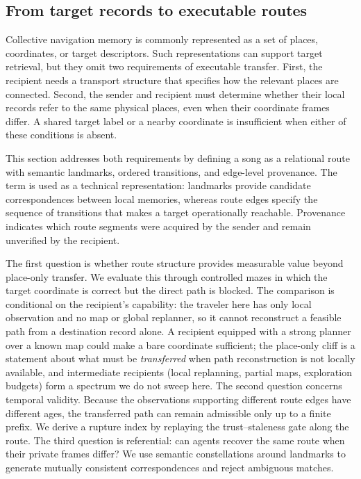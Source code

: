 \documentclass{article}
\begin{document}
\FloatBarrier
\subsection{From target records to executable routes}
\label{p3:sec:intro}

Collective navigation memory is commonly represented as a set of
places, coordinates, or target descriptors. Such representations can
support target retrieval, but they omit two requirements of executable
transfer. First, the recipient needs a transport structure that
specifies how the relevant places are connected. Second, the sender
and recipient must determine whether their local records refer to the
same physical places, even when their coordinate frames differ. A
shared target label or a nearby coordinate is insufficient when either
of these conditions is absent.

This section addresses both requirements by defining a song as a
relational route with semantic landmarks, ordered transitions, and
edge-level provenance. The term is used as a technical representation:
landmarks provide candidate correspondences between local memories,
whereas route edges specify the sequence of transitions that makes a
target operationally reachable. Provenance indicates which route
segments were acquired by the sender and remain unverified by the
recipient.

The first question is whether route structure provides measurable
value beyond place-only transfer. We evaluate this through controlled
mazes in which the target coordinate is correct but the direct path is
blocked. The comparison is conditional on the recipient's capability:
the traveler here has only local observation and no map or global
replanner, so it cannot reconstruct a feasible path from a destination
record alone. A recipient equipped with a strong planner over a known
map could make a bare coordinate sufficient; the place-only cliff is a
statement about what must be \emph{transferred} when path
reconstruction is not locally available, and intermediate recipients
(local replanning, partial maps, exploration budgets) form a spectrum
we do not sweep here. The second question concerns temporal validity. Because the
observations supporting different route edges have different ages,
the transferred path can remain admissible only up to a finite prefix.
We derive a rupture index by replaying the trust--staleness gate along
the route. The third question is referential: can agents recover the
same route when their private frames differ? We use semantic
constellations around landmarks to generate mutually consistent
correspondences and reject ambiguous matches.
\end{document}
